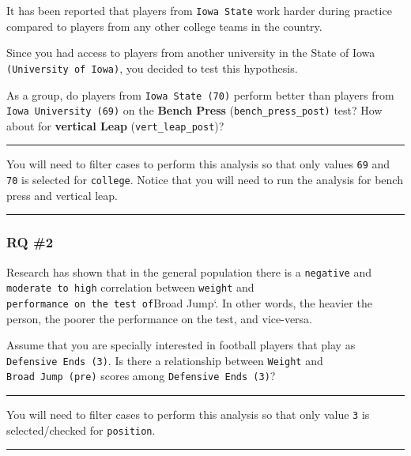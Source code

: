 \documentclass[
]{article}
\begin{document}
It has been reported that players from \texttt{Iowa\ State} work harder during practice compared to players from any other college teams in the country.

Since you had access to players from another university in the State of Iowa \texttt{(University\ of\ Iowa)}, you decided to test this hypothesis.

As a group, do players from \texttt{Iowa\ State\ (70)} perform better than players from \texttt{Iowa\ University\ (69)} on the \textbf{Bench Press} (\texttt{bench\_press\_post)} test? How about for \textbf{vertical Leap} (\texttt{vert\_leap\_post})?

\begin{center}\rule{0.5\linewidth}{0.5pt}\end{center}

You will need to filter cases to perform this analysis so that only values \texttt{69} and \texttt{70} is selected for \texttt{college}. Notice that you will need to run the analysis for bench press and vertical leap.

\begin{center}\rule{0.5\linewidth}{0.5pt}\end{center}

\hypertarget{rq-2}{%
\subsubsection{RQ \#2}\label{rq-2}}

Research has shown that in the general population there is a \texttt{negative} and \texttt{moderate\ to\ high} correlation between \texttt{weight} and \texttt{performance\ on\ the\ test\ of}Broad Jump`. In other words, the heavier the person, the poorer the performance on the test, and vice-versa.

Assume that you are specially interested in football players that play as \texttt{Defensive\ Ends\ (3)}. Is there a relationship between \texttt{Weight} and \texttt{Broad\ Jump\ (pre)} scores among \texttt{Defensive\ Ends\ (3)}?

\begin{center}\rule{0.5\linewidth}{0.5pt}\end{center}

You will need to filter cases to perform this analysis so that only value \texttt{3} is selected/checked for \texttt{position}.

\begin{center}\rule{0.5\linewidth}{0.5pt}\end{center}
\end{document}
